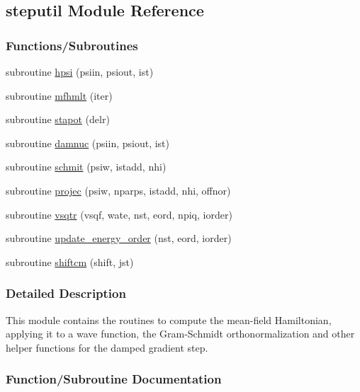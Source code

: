 \hypertarget{namespacesteputil}{}\subsection{steputil Module Reference}
\label{namespacesteputil}
\subsubsection*{Functions/\+Subroutines}
\begin{DoxyCompactItemize}
\item 
subroutine \hyperlink{namespacesteputil_a090a1e879764ac3c51935936ec1e543a}{hpsi} (psiin, psiout, ist)
\item 
subroutine \hyperlink{namespacesteputil_a3c17955fc42e7195ed0dc067ae7d4d6e}{mfhmlt} (iter)
\item 
subroutine \hyperlink{namespacesteputil_a30dc844e256bb5ef44421ff7b07986fd}{stapot} (delr)
\item 
subroutine \hyperlink{namespacesteputil_a20a1c0c92f1a1d4376d1c754c1c83f92}{damnuc} (psiin, psiout, ist)
\item 
subroutine \hyperlink{namespacesteputil_a3f24213fc5023f4b0a3e64d1f70fb652}{schmit} (psiw, istadd, nhi)
\item 
subroutine \hyperlink{namespacesteputil_afe0714411fd5aaa69584a546ee60a10d}{projec} (psiw, nparps, istadd, nhi, offnor)
\item 
subroutine \hyperlink{namespacesteputil_ae78e72bb6f13ff85000ad2d77a5440e8}{vsqtr} (vsqf, wate, nst, eord, npiq, iorder)
\item 
subroutine \hyperlink{namespacesteputil_aeb44d61e037e38d8dc26014c59214b44}{update\+\_\+energy\+\_\+order} (nst, eord, iorder)
\item 
subroutine \hyperlink{namespacesteputil_a41150572a8cf8a08b73a8d157011ac4e}{shiftcm} (shift, jst)
\end{DoxyCompactItemize}


\subsubsection{Detailed Description}
This module contains the routines to compute the mean-\/field Hamiltonian, applying it to a wave function, the Gram-\/\+Schmidt orthonormalization and other helper functions for the damped gradient step. 

\subsubsection{Function/\+Subroutine Documentation}
